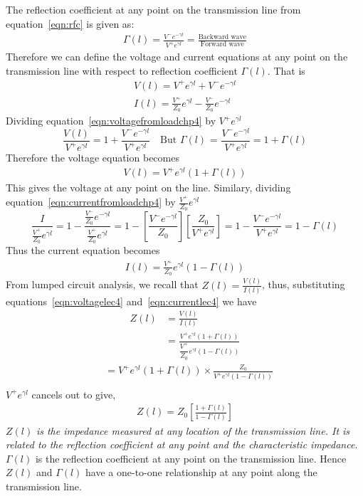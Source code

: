 The reflection coefficient at any point on the transmission line from equation~\eqref{eqn:rfc} is given as:
\begin{align*}
\Gamma{(l)} = \frac{V^-e^{-\gamma l}}{V^+e^{\gamma l}} = \frac{\text{Backward wave}}{\text{Forward wave}}
\end{align*}
Therefore we can define the voltage and current equations at any point on the transmission line with respect to reflection coefficient $\Gamma(l)$. That is
\begin{align}
V(l) = V^+e^{\gamma l} + V^-e^{-\gamma l}\label{eqn:voltagefromloadchp4}\\
I(l) =\frac{V^+}{Z_0} e^{\gamma l} - \frac{V^-}{Z_0}e^{-\gamma l}\label{eqn:currentfromloadchp4}
\end{align}
Dividing equation~\ref{eqn:voltagefromloadchp4} by $V^+e^{\gamma l}$
\begin{dmath*}
\frac{V(l)}{ V^+e^{\gamma l}} = 1 + \frac{ V^-e^{-\gamma l}}{ V^+e^{\gamma l}}\quad\text{But }\Gamma(l)\text{ = }\frac{ V^-e^{-\gamma l}}{ V^+e^{\gamma l}}
= 1 + \Gamma(l)
\end{dmath*}
Therefore the voltage equation becomes
\begin{align}
V(l) = V^+e^{\gamma l} (1 + \Gamma(l))
\label{eqn:voltagelec4}
\end{align}
This gives the voltage at any point on the line. Similary, dividing equation~\ref{eqn:currentfromloadchp4} by $\frac{V^+}{Z_0} e^{\gamma l}$
\begin{dmath*}
\frac{I}{\frac{V^+}{Z_0} e^{\gamma l}} = 1 - \frac{\frac{V^-}{Z_0} e^{-\gamma l}}{\frac{V^+}{Z_0} e^{\gamma l}}
= 1 - [\frac{V^-e^{-\gamma l}}{Z_0}] [\frac{Z_0}{V^+e^{\gamma l}}]
= 1 - \frac{V^-e^{-\gamma l}}{V^+e^{\gamma l}}
= 1 - \Gamma(l)
\end{dmath*}
Thus the current equation becomes
\begin{align}
I(l) = \frac{V^+}{Z_0} e^{\gamma l} (1 - \Gamma(l))
\label{eqn:currentlec4}
\end{align}
From lumped circuit analysis, we recall that $Z(l) = \frac{V(l)}{I(l)}$, thus, substituting equations~\eqref{eqn:voltagelec4} and~\eqref{eqn:currentlec4} we have
\begin{align*}
Z(l) &= \frac{V(l)}{I(l)}\\
&= \frac{V^+e^{\gamma l} (1 + \Gamma(l))}{ \dfrac{V^+}{Z_0} e^{\gamma l} (1 - \Gamma(l))}
\end{align*}
\begin{align*}
	&= V^+e^{\gamma l}(1 + \Gamma(l)) \times \frac{Z_0}{V^+e^{\gamma l}(1 - \Gamma(l))}
\end{align*}
\begin{align*}
\end{align*}
$V^+ e^{\gamma l}$ cancels out to give,
\begin{align}
Z(l) = Z_0\left[\frac{1 + \Gamma(l)}{1 - \Gamma(l)}\right]
\end{align}
$Z(l)$ \emph{is the impedance measured at any location of the transmission line. It is related to the reflection coefficient at any point and the characteristic impedance}. $\Gamma(l)$ is the reflection coefficient at any point on the transmission line. Hence $Z(l)$ and $\Gamma(l)$ have a one-to-one relationship at any point along the transmission line.

